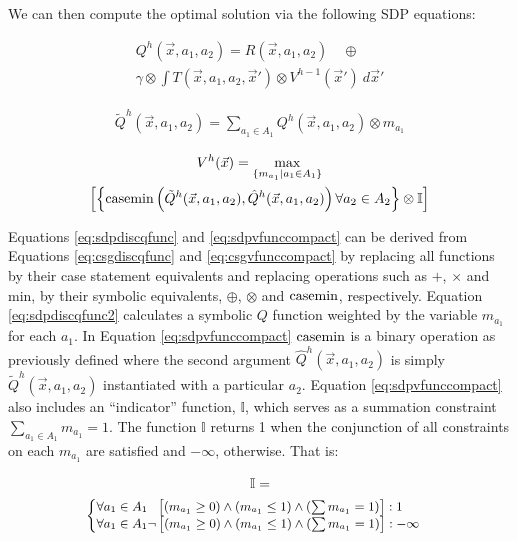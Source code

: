 We can then compute the optimal solution via the following SDP equations:

{\footnotesize 
\abovedisplayskip=0pt
\belowdisplayskip=0pt
\begin{multline}
\label{eq:sdpdiscqfunc}
  Q^{h}(\vec{x}, a_1, a_2) = R(\vec{x}, a_1, a_2) \quad \oplus \\
  \gamma \otimes \int T(\vec{x}, a_1, a_2, \vec{x}') \otimes V^{h-1}(\vec{x}')\ d\vec{x}' 
\end{multline}
}%

{\footnotesize 
\abovedisplayskip=0pt
\belowdisplayskip=0pt
\begin{multline}
\label{eq:sdpdiscqfunc2}
  \tilde{Q}^{h}(\vec{x}, a_1, a_2) = \sum_{a_1 \in A_1} Q^{h}(\vec{x}, a_1, a_2) \otimes m_{a_{1}}
\end{multline}
}%

{\footnotesize 
\abovedisplayskip=0pt
\belowdisplayskip=0pt
\begin{multline}
\label{eq:sdpvfunccompact}
  V^{h}(\vec{x}) = \max_{ \{ m_{a_1} | a_1 \in A_1 \} } \\ \left[ \left\{ \casemin \left( \tilde{Q}^{h}(\vec{x}, a_1, a_2),  \hat{Q}^{h}(\vec{x}, a_1, a_2) \right)  \forall a_2 \in A_2 \right\} \otimes \mathbb{I} \right]
\end{multline}
}%

Equations \eqref{eq:sdpdiscqfunc} and \eqref{eq:sdpvfunccompact} can
be derived from Equations \eqref{eq:csgdiscqfunc} and \eqref{eq:csgvfunccompact}
by replacing all functions by their case statement equivalents and replacing
operations such as $+$, $\times$ and min, by their symbolic equivalents,
$\oplus$, $\otimes$ and $\mathrm{casemin}$, respectively. Equation \eqref{eq:sdpdiscqfunc2}
calculates a symbolic $Q$ function weighted 
by the variable $m_{a_{1}}$ for each $a_1$. In Equation \eqref{eq:sdpvfunccompact} 
$\mathrm{casemin}$ is a binary operation as previously defined where the
second argument $\hat{Q}^{h}(\vec{x}, a_1, a_2)$ is simply
$\tilde{Q}^{h}(\vec{x}, a_1, a_2)$ instantiated with a particular $a_2$.
Equation \eqref{eq:sdpvfunccompact} 
also includes an ``indicator'' function, $\mathbb{I}$, which serves as a summation constraint 
$\sum_{a_{1} \in A_1} m_{a_{1}} = 1$. The function $\mathbb{I}$
returns 1 when the conjunction of all constraints on each $m_{a_1}$ are satisfied
and $-\infty$, otherwise. That is:

{\small 
\abovedisplayskip=0pt
\belowdisplayskip=0pt
\begin{multline*}
  \mathbb{I} = \\
  {\footnotesize
    \begin{cases}
      \forall a_{1} \in A_1 \hspace{6pt}\left[(m_{a_{1}} \geq 0) \wedge (m_{a_{1}} \leq 1 ) \wedge (\sum m_{a_{1}} = 1) \right]: 1 \\ 
      \forall a_{1} \in A_1 \neg \left[(m_{a_{1}} \geq 0) \wedge (m_{a_{1}} \leq 1 ) \wedge (\sum m_{a_{1}} = 1) \right]: -\infty \\ 
    \end{cases} \nonumber
   }
\end{multline*}
}%

